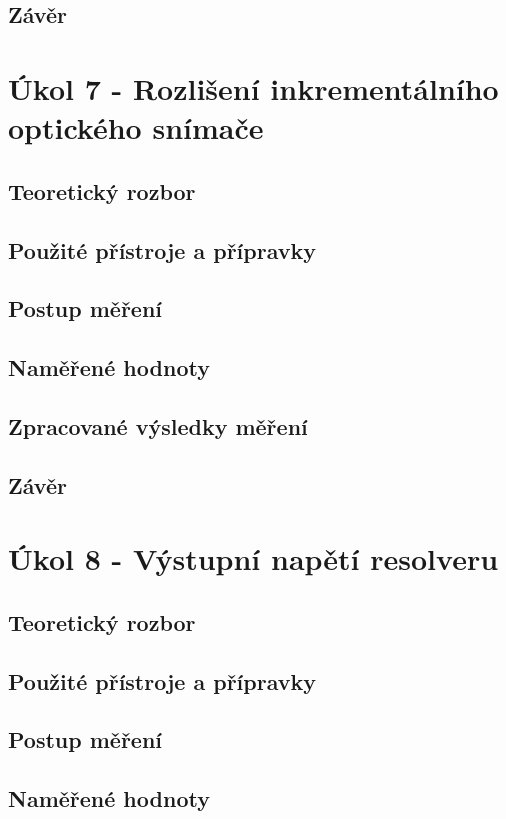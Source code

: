 \documentclass{protokol}
\begin{document}
    \subsection{Závěr}

\pagebreak


\section{Úkol 7 - Rozlišení inkrementálního optického snímače}
    \subsection{Teoretický rozbor}
    \subsection{Použité přístroje a přípravky}
    \subsection{Postup měření}
    \subsection{Naměřené hodnoty}
    \subsection{Zpracované výsledky měření}
    \subsection{Závěr}

\pagebreak
\section{Úkol 8 - Výstupní napětí resolveru}
    \subsection{Teoretický rozbor}
    \subsection{Použité přístroje a přípravky}
    \subsection{Postup měření}
    \subsection{Naměřené hodnoty}
\end{document}
